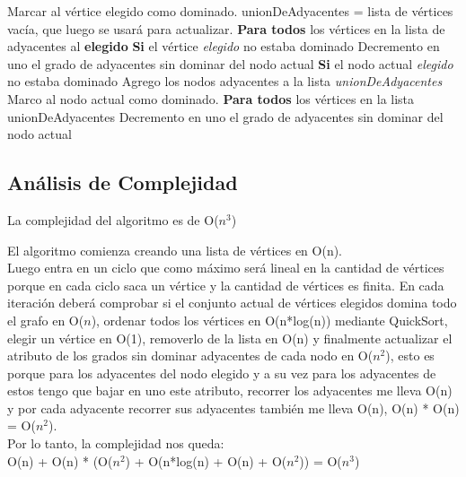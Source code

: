 \begin{codebox}
\li 	Marcar al vértice elegido como dominado.
\li 	unionDeAdyacentes = lista de vértices vacía, que luego se usará para actualizar.
\li 	\textbf{Para todos} los vértices en la lista de adyacentes al \textbf{elegido} \Do
\li 		\textbf{Si} el vértice \textit{elegido} no estaba dominado \Do
\li 			Decremento en uno el grado de adyacentes sin dominar del nodo actual \End
\li 		\textbf{Si} el nodo actual \textit{elegido} no estaba dominado \Do
\li 			Agrego los nodos adyacentes a la lista \textit{unionDeAdyacentes} \End
\li 		Marco al nodo actual como dominado. \End
\li 	\textbf{Para todos} los vértices en la lista unionDeAdyacentes \Do 
\li 			Decremento en uno el grado de adyacentes sin dominar del nodo actual \End %
\end{codebox}

\subsection{Análisis de Complejidad}

La complejidad del algoritmo es de O($n^3$)

El algoritmo comienza creando una lista de vértices en O(n).\\
Luego entra en un ciclo que como máximo será lineal en la cantidad de vértices porque en cada ciclo saca un vértice y la cantidad de vértices es finita. En cada iteración deberá comprobar si el conjunto actual de vértices elegidos domina todo el grafo en O($n$), ordenar todos los vértices en O(n*log(n)) mediante QuickSort, elegir un vértice en O(1), removerlo de la lista en O(n) y finalmente actualizar el atributo de los grados sin dominar adyacentes de cada nodo en O($n^2$), esto es porque para los adyacentes del nodo elegido y a su vez para los adyacentes de estos tengo que bajar en uno este atributo, recorrer los adyacentes me lleva O(n) y por cada adyacente recorrer sus adyacentes también me lleva O(n), O(n) * O(n) = O($n^2$).\\

Por lo tanto, la complejidad nos queda:\\
O(n) + O(n) * (O($n^2$) + O(n*log(n) + O(n) + O($n^2$)) = O($n^3$)\\\\

